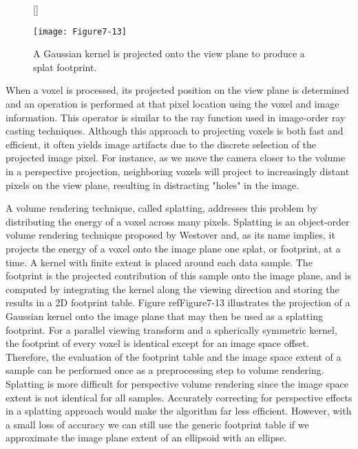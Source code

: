 \begin{figure}[!htb]
	[\FBwidth]
	{\caption{A Gaussian kernel is projected onto the view plane to produce a splat footprint.}\label{fig:Figure7-13}}
	{\texttt{[image: Figure7-13]}}
\end{figure}

When a voxel is processed, its projected position on the view plane is determined and an operation is performed at that pixel location using the voxel and image information. This operator is similar to the ray function used in image-order ray casting techniques. Although this approach to projecting voxels is both fast and efficient, it often yields image artifacts due to the discrete selection of the projected image pixel. For instance, as we move the camera closer to the volume in a perspective projection, neighboring voxels will project to increasingly distant pixels on the view plane, resulting in distracting "holes" in the image.

A volume rendering technique, called splatting, addresses this problem by distributing the energy of a voxel across many pixels. Splatting is an object-order volume rendering technique proposed by Westover \cite{Westover90} and, as its name implies, it projects the energy of a voxel onto the image plane one splat, or footprint, at a time. A kernel with finite extent is placed around each data sample. The footprint is the projected contribution of this sample onto the image plane, and is computed by integrating the kernel along the viewing direction and storing the results in a 2D footprint table. Figure ref{Figure7-13} illustrates the projection of a Gaussian kernel onto the image plane that may then be used as a splatting footprint. For a parallel viewing transform and a spherically symmetric kernel, the footprint of every voxel is identical except for an image space offset. Therefore, the evaluation of the footprint table and the image space extent of a sample can be performed once as a preprocessing step to volume rendering. Splatting is more difficult for perspective volume rendering since the image space extent is not identical for all samples. Accurately correcting for perspective effects in a splatting approach would make the algorithm far less efficient. However, with a small loss of accuracy we can still use the generic footprint table if we approximate the image plane extent of an ellipsoid with an ellipse.

